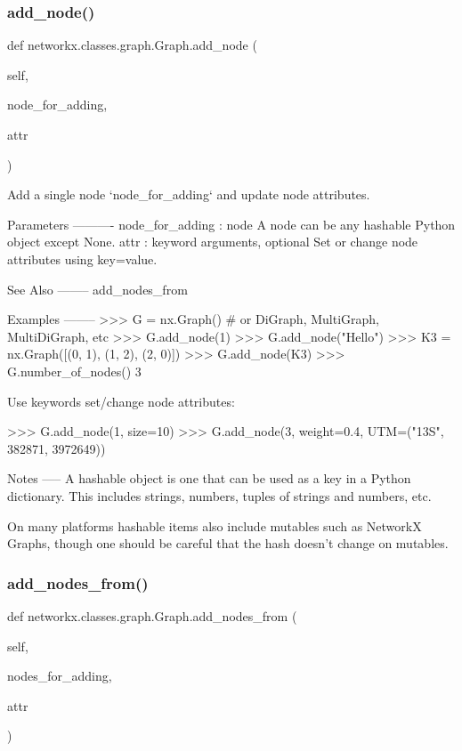 \subsubsection{\texorpdfstring{add\+\_\+node()}{add\_node()}}
{\footnotesize\ttfamily def networkx.\+classes.\+graph.\+Graph.\+add\+\_\+node (\begin{DoxyParamCaption}\item[{}]{self,  }\item[{}]{node\+\_\+for\+\_\+adding,  }\item[{}]{attr }\end{DoxyParamCaption})}

\begin{DoxyVerb}Add a single node `node_for_adding` and update node attributes.

Parameters
----------
node_for_adding : node
    A node can be any hashable Python object except None.
attr : keyword arguments, optional
    Set or change node attributes using key=value.

See Also
--------
add_nodes_from

Examples
--------
>>> G = nx.Graph()  # or DiGraph, MultiGraph, MultiDiGraph, etc
>>> G.add_node(1)
>>> G.add_node("Hello")
>>> K3 = nx.Graph([(0, 1), (1, 2), (2, 0)])
>>> G.add_node(K3)
>>> G.number_of_nodes()
3

Use keywords set/change node attributes:

>>> G.add_node(1, size=10)
>>> G.add_node(3, weight=0.4, UTM=("13S", 382871, 3972649))

Notes
-----
A hashable object is one that can be used as a key in a Python
dictionary. This includes strings, numbers, tuples of strings
and numbers, etc.

On many platforms hashable items also include mutables such as
NetworkX Graphs, though one should be careful that the hash
doesn't change on mutables.
\end{DoxyVerb}
 \mbox{\label{classnetworkx_1_1classes_1_1graph_1_1Graph_ac1237b79b60793c0c4d342160e439163}} 
\subsubsection{\texorpdfstring{add\+\_\+nodes\+\_\+from()}{add\_nodes\_from()}}
{\footnotesize\ttfamily def networkx.\+classes.\+graph.\+Graph.\+add\+\_\+nodes\+\_\+from (\begin{DoxyParamCaption}\item[{}]{self,  }\item[{}]{nodes\+\_\+for\+\_\+adding,  }\item[{}]{attr }\end{DoxyParamCaption})}

